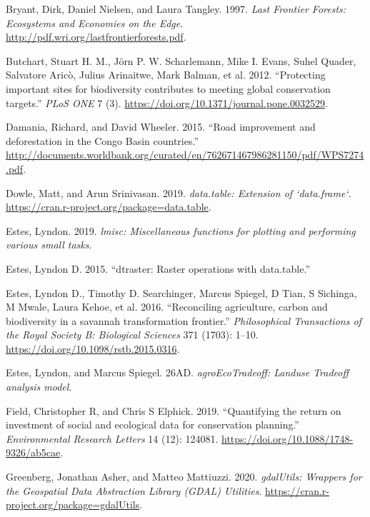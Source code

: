 \documentclass[
]{article}
\begin{document}
\leavevmode\hypertarget{ref-Bryant1997}{}%
Bryant, Dirk, Daniel Nielsen, and Laura Tangley. 1997. \emph{Last Frontier Forests: Ecosystems and Economies on the Edge}. \url{http://pdf.wri.org/lastfrontierforests.pdf}.

\leavevmode\hypertarget{ref-Butchart2012}{}%
Butchart, Stuart H. M., Jörn P. W. Scharlemann, Mike I. Evans, Suhel Quader, Salvatore Aricò, Julius Arinaitwe, Mark Balman, et al. 2012. ``Protecting important sites for biodiversity contributes to meeting global conservation targets.'' \emph{PLoS ONE} 7 (3). \url{https://doi.org/10.1371/journal.pone.0032529}.

\leavevmode\hypertarget{ref-Damania2015}{}%
Damania, Richard, and David Wheeler. 2015. ``Road improvement and deforestation in the Congo Basin countries.'' \url{http://documents.worldbank.org/curated/en/762671467986281150/pdf/WPS7274.pdf}.

\leavevmode\hypertarget{ref-R-data.table}{}%
Dowle, Matt, and Arun Srinivasan. 2019. \emph{data.table: Extension of `data.frame`}. \url{https://cran.r-project.org/package=data.table}.

\leavevmode\hypertarget{ref-R-lmisc}{}%
Estes, Lyndon. 2019. \emph{lmisc: Miscellaneous functions for plotting and performing various small tasks}.

\leavevmode\hypertarget{ref-Estes2015}{}%
Estes, Lyndon D. 2015. ``dtraster: Raster operations with data.table.''

\leavevmode\hypertarget{ref-Estes2016a}{}%
Estes, Lyndon D., Timothy D. Searchinger, Marcus Spiegel, D Tian, S Sichinga, M Mwale, Laura Kehoe, et al. 2016. ``Reconciling agriculture, carbon and biodiversity in a savannah transformation frontier.'' \emph{Philosophical Transactions of the Royal Society B: Biological Sciences} 371 (1703): 1--10. \url{https://doi.org/10.1098/rstb.2015.0316}.

\leavevmode\hypertarget{ref-R-agroEcoTradeoff}{}%
Estes, Lyndon, and Marcus Spiegel. 26AD. \emph{agroEcoTradeoff: Landuse Tradeoff analysis model}.

\leavevmode\hypertarget{ref-Field2019}{}%
Field, Christopher R, and Chris S Elphick. 2019. ``Quantifying the return on investment of social and ecological data for conservation planning.'' \emph{Environmental Research Letters} 14 (12): 124081. \url{https://doi.org/10.1088/1748-9326/ab5cae}.

\leavevmode\hypertarget{ref-R-gdalUtils}{}%
Greenberg, Jonathan Asher, and Matteo Mattiuzzi. 2020. \emph{gdalUtils: Wrappers for the Geospatial Data Abstraction Library (GDAL) Utilities}. \url{https://cran.r-project.org/package=gdalUtils}.
\end{document}
